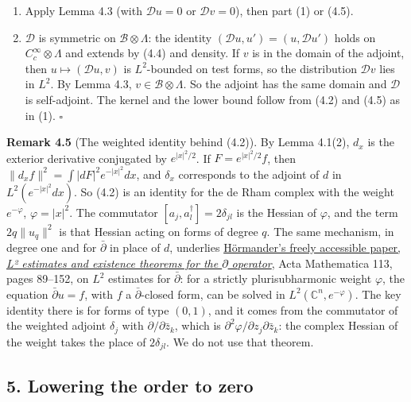 \documentclass[
  11pt,
]{article}
\begin{document}
\begin{enumerate}
\def\labelenumi{(\arabic{enumi})}
\setcounter{enumi}{1}
\item
  Apply Lemma 4.3 (with \(\mathcal Du=0\) or \(\mathcal Dv=0\)), then
  part (1) or (4.5).
\item
  \(\mathcal D\) is symmetric on \(\mathcal B\otimes\Lambda\): the
  identity \((\mathcal Du,u')=(u,\mathcal Du')\) holds on
  \(C_c^\infty\otimes\Lambda\) and extends by (4.4) and density. If
  \(v\) is in the domain of the adjoint, then
  \(u\mapsto(\mathcal Du,v)\) is \(L^2\)-bounded on test forms, so the
  distribution \(\mathcal Dv\) lies in \(L^2\). By Lemma 4.3,
  \(v\in\mathcal B\otimes\Lambda\). So the adjoint has the same domain
  and \(\mathcal D\) is self-adjoint. The kernel and the lower bound
  follow from (4.2) and (4.5) as in (1). \(\square\)
\end{enumerate}

\textbf{Remark 4.5} (The weighted identity behind (4.2)). By Lemma
4.1(2), \(d_x\) is the exterior derivative conjugated by
\(e^{|x|^2/2}\). If \(F=e^{|x|^2/2}f\), then
\(\|d_xf\|^2=\int|dF|^2e^{-|x|^2}dx\), and \(\delta_x\) corresponds to
the adjoint of \(d\) in \(L^2(e^{-|x|^2}dx)\). So (4.2) is an identity
for the de Rham complex with the weight \(e^{-\varphi}\),
\(\varphi=|x|^2\). The commutator \([a_j,a_l^\dagger]=2\delta_{jl}\) is
the Hessian of \(\varphi\), and the term \(2q\|u_q\|^2\) is that Hessian
acting on forms of degree \(q\). The same mechanism, in degree one and
for \(\bar\partial\) in place of \(d\), underlies
\href{https://archive.ymsc.tsinghua.edu.cn/pacm_journal?journal=Acta+Mathematica&year=1964}{Hörmander's
freely accessible paper, \emph{L² estimates and existence theorems for
the \ensuremath{\partial}̄ operator}}, Acta Mathematica 113, pages 89--152, on \(L^2\)
estimates for \(\bar\partial\): for a strictly plurisubharmonic weight
\(\varphi\), the equation \(\bar\partial u=f\), with \(f\) a
\(\bar\partial\)-closed form, can be solved in
\(L^2(\mathbb C^n,e^{-\varphi})\). The key identity there is for forms
of type \((0,1)\), and it comes from the commutator of the weighted
adjoint \(\delta_j\) with \(\partial/\partial\bar z_k\), which is
\(\partial^2\varphi/\partial z_j\partial\bar z_k\): the complex Hessian
of the weight takes the place of \(2\delta_{jl}\). We do not use that
theorem.

\subsection{5. Lowering the order to
zero}\label{lowering-the-order-to-zero}
\end{document}
